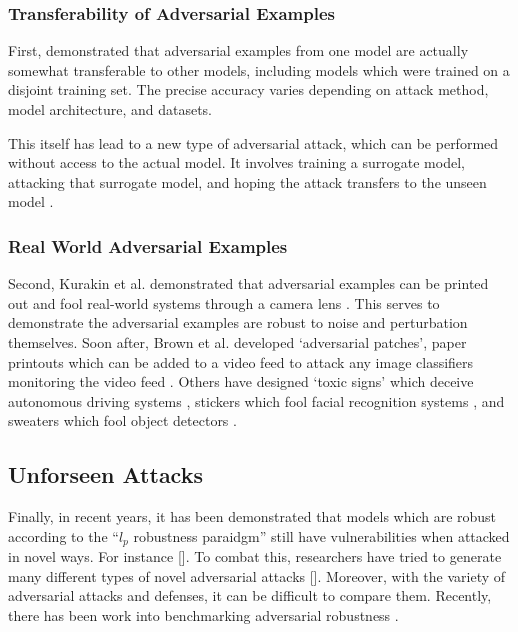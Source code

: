 \documentclass{article}
\begin{document}
\subsubsection{Transferability of Adversarial Examples}
\label{subsub:transfer}
First, \cite{szegedy2014intriguing, goodfellow2015explaining} demonstrated that adversarial examples from one model are actually somewhat transferable to other models, including models which were trained on a disjoint training set. The precise accuracy varies depending on attack method, model architecture, and datasets.

This itself has lead to a new type of adversarial attack, which can be performed without access to the actual model. It involves training a surrogate model, attacking that surrogate model, and hoping the attack transfers to the unseen model \cite{papernot2016transferability, papernot2017practical}. 


\subsubsection{Real World Adversarial Examples}
\label{subsub:real}

Second, Kurakin et al. demonstrated that adversarial examples can be printed out and fool real-world systems through a camera lens \cite{kurakin2017adversarial}. This serves to demonstrate the adversarial examples are robust to noise and perturbation themselves. Soon after, Brown et al. developed `adversarial patches', paper printouts which can be added to a video feed to attack any image classifiers monitoring the video feed \cite{brown2018adversarial}. Others have designed `toxic signs' which deceive autonomous driving systems \cite{sitawarin2018darts}, stickers which fool facial recognition systems \cite{komkov2021advhat}, and sweaters which fool object detectors \cite{wu2020making}.



\subsection{Unforseen Attacks}
\label{sub:unforseen}

Finally, in recent years, it has been demonstrated that models which are robust according to the ``$l_p$ robustness paraidgm'' still have vulnerabilities when attacked in novel ways. For instance []. To combat this, researchers have tried to generate many different types of novel adversarial attacks []. Moreover, with the variety of adversarial attacks and defenses, it can be difficult to compare them. Recently, there has been work into benchmarking adversarial robustness \cite{croce2021robustbench}. 




\end{document}
